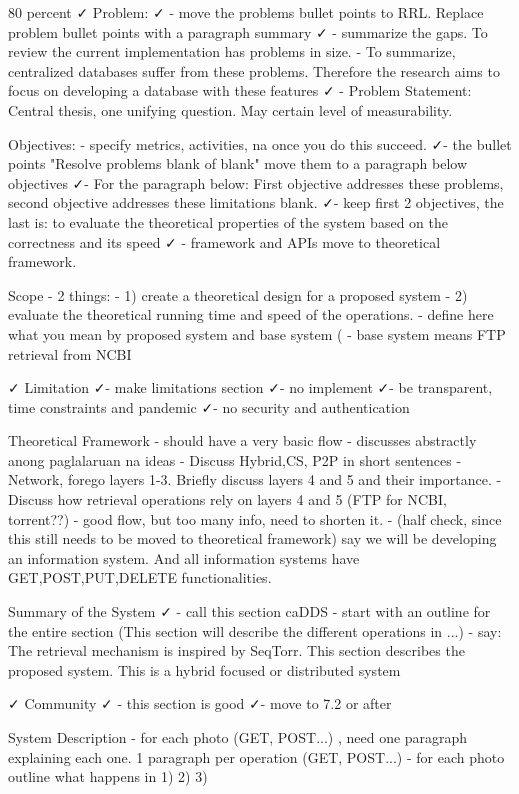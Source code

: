 80 percent ✓ Problem:
✓ - move the problems bullet points to RRL. Replace problem bullet points with a paragraph summary 
✓ - summarize the gaps. To review the current implementation has problems in size.
- To summarize, centralized databases suffer from these problems. Therefore the research aims to focus on developing a database with these features
✓ - Problem Statement: Central thesis, one unifying question. May certain level of measurability.

Objectives:
- specify metrics, activities, na once you do this succeed.
✓- the bullet points "Resolve problems blank of blank" move them to a paragraph below objectives
✓- For the paragraph below: First objective addresses these problems, second objective addresses these limitations blank.
✓- keep first 2 objectives, the last is: to evaluate the theoretical properties of the system based on the correctness and its speed
✓ - framework and APIs move to theoretical framework. 


Scope
- 2 things: 
- 1) create a theoretical design for a proposed system
- 2) evaluate the theoretical running time and speed of the operations.
- define here what you mean by proposed system and base system (
- base system means FTP retrieval from NCBI

✓ Limitation
✓- make limitations section
✓- no implement
✓- be transparent, time constraints and pandemic
✓- no security and authentication


Theoretical Framework
- should have a very basic flow
- discusses abstractly anong paglalaruan na ideas
- Discuss Hybrid,CS, P2P in short sentences
- Network, forego layers 1-3. Briefly discuss layers 4 and 5 and their importance.
- Discuss how retrieval operations rely on layers 4 and 5 (FTP for NCBI, torrent??)
- good flow, but too many info, need to shorten it.
- (half check, since this still needs to be moved to theoretical framework) say we will be developing an information system. And all information systems have GET,POST,PUT,DELETE functionalities.


Summary of the System
✓ - call this section caDDS
- start with an outline for the entire section (This section will describe the different operations in ...)
- say: The retrieval mechanism is inspired by SeqTorr. This section describes the proposed system. This is a hybrid focused or distributed system

✓ Community
✓ - this section is good
✓- move to 7.2 or after

System Description
- for each photo (GET, POST...) , need one paragraph explaining each one. 1 paragraph per operation (GET, POST...)
- for each photo outline what happens in 1) 2) 3)


